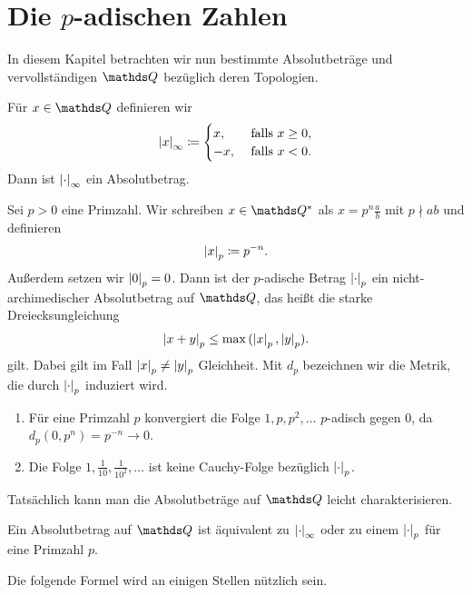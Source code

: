 \chapter{Die $p$-adischen Zahlen}
In diesem Kapitel betrachten wir nun bestimmte Absolutbeträge und vervollständigen $\Q$ bezüglich deren Topologien.

Für $x\in \Q$ definieren wir
\begin{align*}
\left\vert x\right\vert_\infty\coloneqq\begin{cases}
x, &\text{ falls } x\geq 0,\\
-x, &\text{ falls } x<0.
\end{cases}
\end{align*}
Dann ist $\left\vert\cdot\right\vert_\infty$ ein Absolutbetrag.

Sei $p>0$ eine Primzahl. Wir schreiben $x\in \Q^\ast$ als $x=p^n \frac{a}{b}$ mit $p \nmid ab$ und definieren
\begin{align*}
\left\vert x\right\vert_p \coloneqq p^{-n}.
\end{align*}
Außerdem setzen wir $\left\vert0\right\vert_p=0$.
Dann ist der $p$-adische Betrag $\left\vert\cdot\right\vert_p$ ein nicht-archimedischer Absolutbetrag auf $\Q$, das heißt die starke Dreiecksungleichung
\begin{align*}
\left\vert x+y\right\vert_p\leq \max{(\left\vert x\right\vert_p,\left\vert y\right\vert_p)}.
\end{align*}
gilt. Dabei gilt im Fall $\left\vert x\right\vert_p \not= \left\vert y\right\vert_p$ Gleichheit.
Mit $d_p$ bezeichnen wir die Metrik, die durch $\left\vert\cdot\right\vert_p$ induziert wird.

\begin{bsp}
\begin{enumerate}[label=\roman*)]
\item Für eine Primzahl $p$ konvergiert die Folge $1,p,p^2,\dots$ $p$-adisch gegen $0$, da $d_p(0,p^n)=p^{-n}\to 0$.
\item Die Folge $1,\frac{1}{10},\frac{1}{10^2},\dots$ ist keine Cauchy-Folge bezüglich $\left\vert\cdot\right\vert_p$.
\end{enumerate}
\end{bsp}

Tatsächlich kann man die Absolutbeträge auf $\Q$ leicht charakterisieren.
\begin{thm}[Ostrowski]
Ein Absolutbetrag auf $\Q$ ist äquivalent zu $\left\vert\cdot\right\vert_\infty$ oder zu einem $\left\vert\cdot\right\vert_p$ für eine Primzahl $p$.
\end{thm}

Die folgende Formel wird an einigen Stellen nützlich sein.

